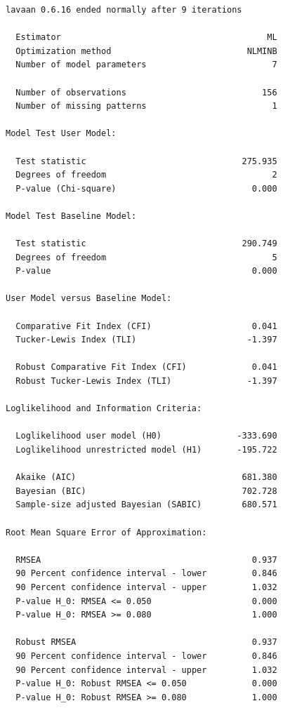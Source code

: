 \documentclass[
  11pt,
]{book}
\begin{document}
\begin{verbatim}
lavaan 0.6.16 ended normally after 9 iterations

  Estimator                                         ML
  Optimization method                           NLMINB
  Number of model parameters                         7

  Number of observations                           156
  Number of missing patterns                         1

Model Test User Model:
                                                      
  Test statistic                               275.935
  Degrees of freedom                                 2
  P-value (Chi-square)                           0.000

Model Test Baseline Model:

  Test statistic                               290.749
  Degrees of freedom                                 5
  P-value                                        0.000

User Model versus Baseline Model:

  Comparative Fit Index (CFI)                    0.041
  Tucker-Lewis Index (TLI)                      -1.397
                                                      
  Robust Comparative Fit Index (CFI)             0.041
  Robust Tucker-Lewis Index (TLI)               -1.397

Loglikelihood and Information Criteria:

  Loglikelihood user model (H0)               -333.690
  Loglikelihood unrestricted model (H1)       -195.722
                                                      
  Akaike (AIC)                                 681.380
  Bayesian (BIC)                               702.728
  Sample-size adjusted Bayesian (SABIC)        680.571

Root Mean Square Error of Approximation:

  RMSEA                                          0.937
  90 Percent confidence interval - lower         0.846
  90 Percent confidence interval - upper         1.032
  P-value H_0: RMSEA <= 0.050                    0.000
  P-value H_0: RMSEA >= 0.080                    1.000
                                                      
  Robust RMSEA                                   0.937
  90 Percent confidence interval - lower         0.846
  90 Percent confidence interval - upper         1.032
  P-value H_0: Robust RMSEA <= 0.050             0.000
  P-value H_0: Robust RMSEA >= 0.080             1.000


\end{verbatim}
\end{document}
